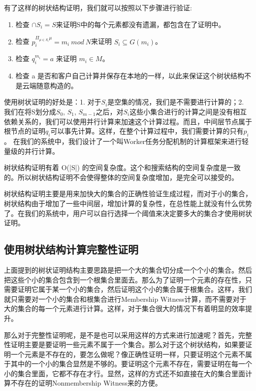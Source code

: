 有了这样的树状结构证明，我们就可以按照以下步骤进行验证:
\begin{enumerate}
  \item 检查 $\cap S_i = S$来证明S中的每个元素都没有遗漏，都包含在了证明中。
  \item 检查 $p_i^{\Pi_{\mu \in S_i} \mu} = m_i\ mod\ N$来证明 $S_i \subseteq G(m_i)$。
  \item 检查 $q_i^{m_i} = a$ 来证明 $m_i \in M$。
  \item 检查 a 是否和客户自己计算并保存在本地的一样，以此来保证这个树状结构不是云端随意构造的。
\end{enumerate}

使用树状证明的好处是：1. 对于$S_i$是空集的情况，我们是不需要进行计算的；2. 我们在将S划分成$S_0$, $S_1$, $S_{m-1}$之后，对$S_i$这些小集合进行的计算之间是没有相互依赖关系的，我们可以使用并行计算来加速这个计算过程。而且，中间层节点属于根节点的证明$q_i$可以事先计算。这样，在整个计算过程中，我们需要计算的只有$p_i$。
在我们的系统中，我们设计了一个叫Worker任务分配机制的计算框架来进行轻量级的并行计算。

树状结构证明有着 O(|S|) 的空间复杂度。这个和搜索结构的空间复杂度是一致的。所以树状结构证明不会使得整体的空间复杂度增加，是完全可以接受的。

树状结构证明主要是用来加快大的集合的正确性验证生成过程，而对于小的集合，树状结构由于增加了一些中间层，增加计算的复杂性，在总性能上就没有什么优势了。在我们的系统中，用户可以自行选择一个阈值来决定要多大的集合才使用树状证明。

\subsection{使用树状结构计算完整性证明}
上面提到的树状证明结构主要思路是把一个大的集合切分成一个个小的集合。然后把这些个小的集合包含到一个根集合里面去。那么为了证明一个元素的存在性，只需要证明它属于某一个小的集合，然后证明这个小的集合属于根集合。这样，我们就只需要对一个小的集合和根集合进行Membership Witness计算，而不需要对于大的集合的每一个元素进行计算。这样，对于集合很大的情况下有着明显的效率提升。

那么对于完整性证明呢，是不是也可以采用这样的方式来进行加速呢？首先，完整性证明主要是要证明一些元素不属于一个集合。那么对于这个树状结构，如果要证明一个元素是不存在的，要怎么做呢？像正确性证明一样，只要证明这个元素不属于其中的一个小的集合显然是不够的。要证明这个元素不存在，需要证明在每一个小的集合里面，它都不存在才行。显然，这样的方式还不如直接在大的集合里面计算不存在的证明Nonmembership Witness来的方便。


